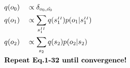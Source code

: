 \documentclass[fleqn]{article}
\begin{document}
\begin{minipage}[t]{0.5\textwidth}
\begin{alignat}{2}
         & q(o_0)                                                              &  & \propto \delta_{o_0,\hat{o_0}}                                                                                                                                                 \\
         & q(o_1)                                                              &  & \propto \sum_{s^{\scriptscriptstyle II}_1} q(s^{\scriptscriptstyle II}_1) p(o_1|s^{\scriptscriptstyle II}_1)                                                                   \\
         & q(o_2)                                                              &  & \propto \sum_{s_2} q(s_2) p(o_2|s_2)                                                                                                                                           \\
         & \rlap{\text{\bfseries Repeat Eq.1-32 until convergence!}} \nonumber
    \end{alignat}
\end{minipage}
\end{document}
